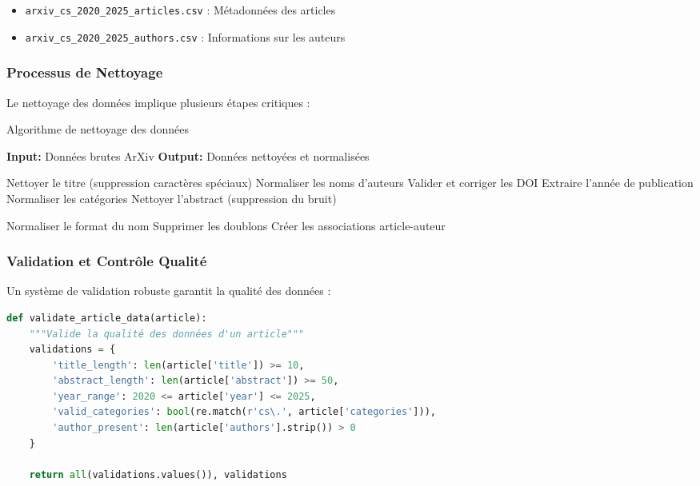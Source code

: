 \documentclass[12pt,a4paper]{article}
\begin{document}
\begin{itemize}
    \item \texttt{arxiv\_cs\_2020\_2025\_articles.csv} : Métadonnées des articles
    \item \texttt{arxiv\_cs\_2020\_2025\_authors.csv} : Informations sur les auteurs
\end{itemize}

\subsubsection{Processus de Nettoyage}

Le nettoyage des données implique plusieurs étapes critiques :

\begin{algorithm}[H]
\caption{Algorithme de nettoyage des données}
\begin{algorithmic}[1]
\STATE \textbf{Input:} Données brutes ArXiv
\STATE \textbf{Output:} Données nettoyées et normalisées

    \STATE Nettoyer le titre (suppression caractères spéciaux)
    \STATE Normaliser les noms d'auteurs
    \STATE Valider et corriger les DOI
    \STATE Extraire l'année de publication
    \STATE Normaliser les catégories
    \STATE Nettoyer l'abstract (suppression du bruit)
\ENDFOR

    \STATE Normaliser le format du nom
    \STATE Supprimer les doublons
    \STATE Créer les associations article-auteur
\ENDFOR
\end{algorithmic}
\end{algorithm}

\subsubsection{Validation et Contrôle Qualité}

Un système de validation robuste garantit la qualité des données :

\begin{lstlisting}[language=Python, caption=Validation des données]
def validate_article_data(article):
    """Valide la qualité des données d'un article"""
    validations = {
        'title_length': len(article['title']) >= 10,
        'abstract_length': len(article['abstract']) >= 50,
        'year_range': 2020 <= article['year'] <= 2025,
        'valid_categories': bool(re.match(r'cs\.', article['categories'])),
        'author_present': len(article['authors'].strip()) > 0
    }
    
    return all(validations.values()), validations
\end{lstlisting}
\end{document}
